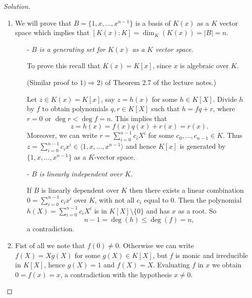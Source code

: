 \documentclass[a4paper,10pt,reqno]{amsart}
\newenvironment{sol}
  {\renewcommand\qedsymbol{$\blacksquare$}\begin{proof}[Solution]}
  {\end{proof}}
\begin{document}
\begin{sol}~
    \begin{enumerate}[label=(\roman*)]
    \item We will prove that $B=\{1,x,\dots, x^{n-1}\}$ is a basis of $K(x)$ as a $K$ vector space which implies that $[K(x):K]=\dim_K(K(x))=|B|=n$.
    \begin{itemize}
        \item[-] \textit{$B$ is a generating set for $K(x)$ as a $K$ vector space.}
        
        To prove this recall that $K(x)=K[x]$, since $x$ is algebraic over $K$.
        
        (Similar proof to $1)\Rightarrow 2)$ of Theorem 2.7 of the lecture notes.)

        Let $z\in K(x)=K[x]$, say $z=h(x)$ for some $h\in K[X]$. 
        Divide $h$ by $f$ to obtain polynomials $q,r\in K[X]$ 
        such that $h=fq+r$, where $r=0$ or $\deg r<\deg f=n$. This implies that
	\[
		z=h(x)=f(x)q(x)+r(x)=r(x).
	\]
	Moreover, we can write
        $r=\sum_{i=0}^{n-1}c_iX^i$ for some $c_0,\dots,c_{n-1}\in K$. 
        Thus $z=\sum_{i=0}^{n-1}c_ix^i\in \langle 1,x,\dots,x^{n-1}\rangle$
        and hence $K[x]$ is generated by $\{1,x,\dots,x^{n-1}\}$ as a $K$-vector space.
        \item[-] \textit{$B$ is linearly independent over $K$.}

        If $B$ is linearly dependent over $K$ then there exists a linear combination 
        $0=\sum_{i=0}^{n-1}c_ix^i$ over $K$, with not all $c_i$ equal to 0.
        Then the polynomial $h(X)=\sum_{i=0}^{n-1}c_iX^i$ is in $K[X]\setminus\{0\}$
        and has $x$ as a root.
        So 
        \[
        n-1=\deg(h)\leq \deg(f)=n,
        \]
     a contradiction.    
    \end{itemize}
    \item Fist of all we note that $f(0)\neq 0$. Otherwise we can write $f(X)=Xg(X)$ for some $g(X)\in K[X]$, but $f$ is monic and irreducible in $K[X]$, hence $g(X)=1$ and $f(X)=X$.
    Evaluating $f$ in $x$ we obtain $0=f(x)=x$, a contradiction with the hypothesis $x\neq 0$.


\end{enumerate}
\end{sol}
\end{document}

